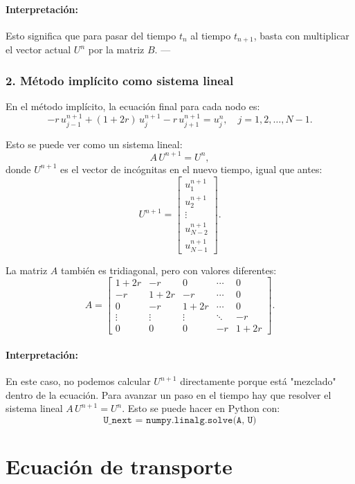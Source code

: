 \documentclass[12pt,a4paper]{article}
\begin{document}
\paragraph{Interpretación:}  
Esto significa que para pasar del tiempo \(t_n\) al tiempo \(t_{n+1}\), basta con multiplicar el vector actual \(U^n\) por la matriz \(B\).  
---

\subsubsection*{2. Método implícito como sistema lineal}

En el método implícito, la ecuación final para cada nodo es:
\[
-r\,u_{j-1}^{n+1} + (1+2r)\,u_j^{n+1} - r\,u_{j+1}^{n+1} = u_j^n,
\quad j = 1, 2, \dots, N-1.
\]

Esto se puede ver como un sistema lineal:
\[
A\,U^{n+1} = U^n,
\]
donde \(U^{n+1}\) es el vector de incógnitas en el nuevo tiempo, igual que antes:
\[
U^{n+1} = 
\begin{bmatrix}
u_1^{n+1} \\ u_2^{n+1} \\ \vdots \\ u_{N-2}^{n+1} \\ u_{N-1}^{n+1}
\end{bmatrix}.
\]

La matriz \(A\) también es tridiagonal, pero con valores diferentes:
\[
A = 
\begin{bmatrix}
1+2r & -r    & 0     & \cdots & 0 \\[4pt]
-r    & 1+2r & -r    & \cdots & 0 \\[4pt]
0     & -r    & 1+2r & \cdots & 0 \\[4pt]
\vdots& \vdots& \vdots& \ddots & -r \\[4pt]
0     & 0     & 0     & -r     & 1+2r
\end{bmatrix}.
\]

\paragraph{Interpretación:}  
En este caso, no podemos calcular \(U^{n+1}\) directamente porque está "mezclado" dentro de la ecuación.  
Para avanzar un paso en el tiempo hay que resolver el sistema lineal \(A\,U^{n+1}=U^n\).  
Esto se puede hacer en Python con:
\[
\texttt{U\_next = numpy.linalg.solve(A, U)}
\]

\section{Ecuación de transporte}
\end{document}

